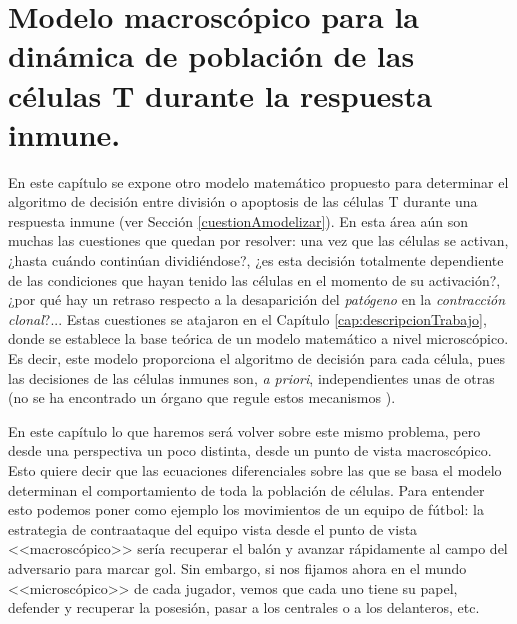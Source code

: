 
\chapter{Modelo macroscópico para la dinámica de población de las células T durante la respuesta inmune.}
\label{cap:modeloMacroscopico}

En este capítulo se expone otro modelo matemático propuesto para determinar el algoritmo de decisión entre división o apoptosis de las células T durante una respuesta inmune (ver Sección \ref{cuestionAmodelizar}). En esta área aún son muchas las cuestiones que quedan por resolver: una vez que las células se activan, ¿hasta cuándo continúan dividiéndose?, ¿es esta decisión totalmente dependiente de las condiciones que hayan tenido las células en el momento de su activación?, ¿por qué hay un retraso respecto a la desaparición del \textit{patógeno} en la \textit{contracción clonal}?... Estas cuestiones se atajaron en el Capítulo \ref{cap:descripcionTrabajo}, donde se establece la base teórica de un modelo matemático a nivel microscópico. Es decir, este modelo proporciona el algoritmo de decisión para cada célula, pues las decisiones de las células inmunes son, \textit{a priori}, independientes unas de otras (no se ha encontrado un órgano que regule estos mecanismos \citep{arias2016emergent}).

En este capítulo lo que haremos será volver sobre este mismo problema, pero desde una perspectiva un poco distinta, desde un punto de vista macroscópico. Esto quiere decir que las ecuaciones diferenciales sobre las que se basa el modelo determinan el comportamiento de toda la población de células. Para entender esto podemos poner como ejemplo los movimientos de un equipo de fútbol: la estrategia de contraataque del equipo vista desde el punto de vista <<macroscópico>> sería recuperar el balón y avanzar rápidamente al campo del adversario para marcar gol. Sin embargo, si nos fijamos ahora en el mundo <<microscópico>> de cada jugador, vemos que cada uno tiene su papel, defender y recuperar la posesión, pasar a los centrales o a los delanteros, etc.


